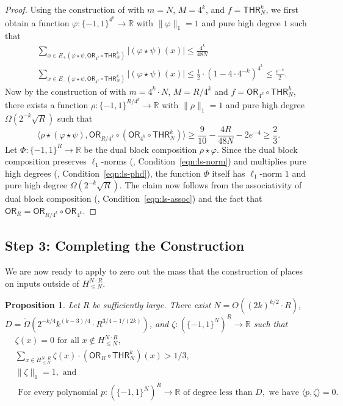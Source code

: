 \documentclass[11pt, letterpaper, fleqn]{article}
\newtheorem{proposition}[theorem]{Proposition}
\theoremstyle{plain}
\newcommand{\R}{\mathbb{R}}
\newcommand{\OR}{\mathsf{ OR}}
\newcommand{\THR}{\mathsf{THR}}
\newcommand{\bits}{\{-1,1\}}
\newcommand{\ls}{\star}
\newcommand{\tOmega}{\tilde{\Omega}}
\begin{document}
\begin{proof}
Using the construction of  with $m = N$, $M = 4^k$, and $f = \THR_N^k$, we first obtain a function $\varphi : \bits^{4^k} \to \R$ with $\|\varphi\|_1 = 1$ and pure high degree $1$ such that
\begin{align*}
&\sum_{x \in E_+(\varphi \ls \psi, \OR_{4^k} \circ \THR^k_N)} |(\varphi \ls \psi)(x)| \le \frac{4^k}{48 N} \\
&\sum_{x \in E_-(\varphi \ls \psi, \OR_{4^k} \circ \THR^k_N)} |(\varphi \ls \psi)(x)| \le \frac{1}{2} \cdot \left(1 - 4 \cdot 4^{-k} \right)^{4^k} \le \frac{e^{-4}}{2}.
\end{align*}
Now by the construction of  with $m = 4^k \cdot N$, $M = R/4^{k}$ and $f = \OR_{4^k} \circ \THR_N^k$, there exists a function $\rho : \bits^{R / 4^k} \to \R$ with $\|\rho\|_1 = 1$ and pure high degree $\Omega(2^{-k}\sqrt{R})$ such that
\[ \langle \rho \ls (\varphi \ls \psi), \OR_{R/4^k} \circ (\OR_{4^k} \circ \THR^k_N) \rangle \ge \frac{9}{10} - \frac{4R}{48 N} - 2e^{-4} \ge \frac{2}{3}.\]
Let $\Phi : \bits^R \to \R$ be the dual block composition $\rho \ls \varphi$. Since the dual block composition preserves $\ell_1$-norms (, Condition~\eqref{eqn:ls-norm}) and multiplies pure high degrees (, Condition~\eqref{eqn:ls-phd}), the function $\Phi$ itself has $\ell_1$-norm $1$ and pure high degree $\Omega(2^{-k} \sqrt{R})$. The claim now follows from the associativity of dual block composition (, Condition~\eqref{eqn:ls-assoc}) and the fact that $\OR_R = \OR_{R/4^k} \circ \OR_{4^k}$.
\end{proof}



\subsection{Step 3: Completing the Construction} 

We are now ready to apply  to zero out the mass that the construction of  places on inputs outside of $H_{\le N}^{N \cdot R}$.

\begin{proposition} \label{prop:dist-dual}
Let $R$ be sufficiently large. There exist $N = O((2k)^{k/2} \cdot R)$, $D = \tOmega(2^{-k/4} k^{(k-3)/ 4} \cdot R^{3/4 - 1/(2k)})$, and  $\zeta : (\bits^N)^R \to \R$ such that
\begin{align} \label{eq:dist-zero} &\zeta(x) = 0 \text{ for all } x \not\in H_{\le N}^{N \cdot R}, \\
\label{eq:dist-corr} &\sum_{x \in H_{\le N}^{N \cdot R}}\zeta(x) \cdot (\OR_{R} \circ \THR_N^k)(x) > 1/3, \\
 \label{eq:dist-unitnorm} &\|\zeta\|_1 = 1, \text{ and }  \\
 \label{eq:dist-phd} &\text{ For every polynomial } p \colon (\bits^N)^{R}\to \R \text{ of degree less than } D, \text{ we have } \langle p, \zeta \rangle = 0. 
\end{align}
\end{proposition}
\end{document}
